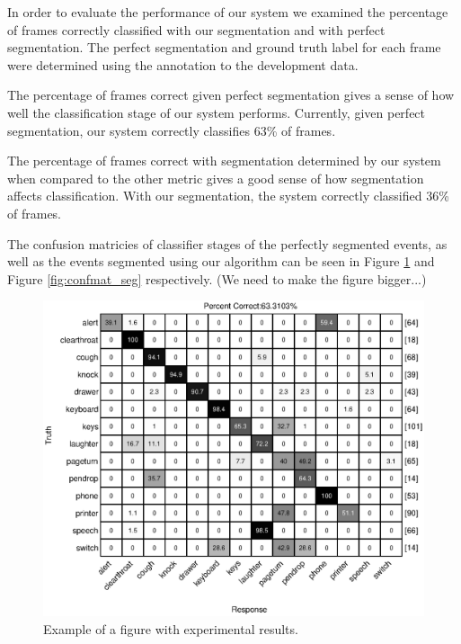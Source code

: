 In order to evaluate the performance of our system we examined the percentage of frames 
correctly classified with our segmentation and with perfect segmentation. The perfect
segmentation and ground truth label for each frame were determined using the annotation
to the development data.

The percentage of frames correct given perfect segmentation gives a sense of how well the
classification stage of our system performs. Currently, given perfect segmentation,
our system correctly classifies 63\% of frames. 

The percentage of frames correct with segmentation determined by our system when compared to the other metric
gives a good sense of how segmentation affects classification. With our segmentation, the 
system correctly classified 36\% of frames.

The confusion matricies of classifier stages of the perfectly segmented events, as well as the events segmented using our algorithm can be seen in Figure \ref{fig:confmat_perfect} and Figure \ref{fig:confmat_seg} respectively. (We need to make the figure bigger...)

\begin{figure}[h]
  \centering
  \centerline{\includegraphics[width=\columnwidth]{confmatrix1}}
  \caption{Example of a figure with experimental results.}
  \label{fig:confmat_perfect}
\end{figure}

